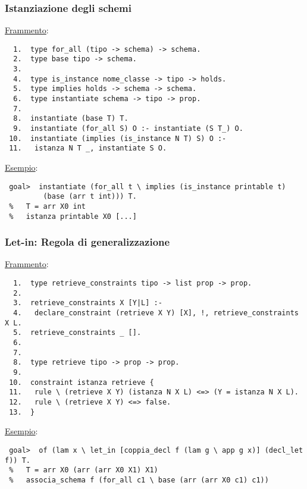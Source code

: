 \documentclass{beamer}
\begin{document}
\begin{frame}[fragile=singleslide]      %

 \frametitle{Istanziazione degli schemi}

 \underline{Frammento}:
 \begin{verbatim}
  1.  type for_all (tipo -> schema) -> schema.
  2.  type base tipo -> schema.
  3.
  4.  type is_instance nome_classe -> tipo -> holds.
  5.  type implies holds -> schema -> schema.
  6.  type instantiate schema -> tipo -> prop.
  7.
  8.  instantiate (base T) T.
  9.  instantiate (for_all S) O :- instantiate (S T_) O.
 10.  instantiate (implies (is_instance N T) S) O :-
 11.   istanza N T _, instantiate S O.
 \end{verbatim}

 \vfill

 \underline{Esempio}:
 \begin{verbatim}
 goal>  instantiate (for_all t \ implies (is_instance printable t)
         (base (arr t int))) T.
 %   T = arr X0 int
 %   istanza printable X0 [...]
 \end{verbatim}

\end{frame}


\begin{frame}[fragile=singleslide]      %

 \frametitle{Let-in: Regola di generalizzazione}

 \underline{Frammento}:
 \begin{verbatim}
  1.  type retrieve_constraints tipo -> list prop -> prop.
  2.
  3.  retrieve_constraints X [Y|L] :-
  4.   declare_constraint (retrieve X Y) [X], !, retrieve_constraints X L.
  5.  retrieve_constraints _ [].
  6.
  7.
  8.  type retrieve tipo -> prop -> prop.
  9.
 10.  constraint istanza retrieve {
 11.   rule \ (retrieve X Y) (istanza N X L) <=> (Y = istanza N X L).
 12.   rule \ (retrieve X Y) <=> false.
 13.  }
 \end{verbatim}
 
 \vfill

 \underline{Esempio}:
 \begin{verbatim}
 goal>  of (lam x \ let_in [coppia_decl f (lam g \ app g x)] (decl_let f)) T.
 %   T = arr X0 (arr (arr X0 X1) X1)
 %   associa_schema f (for_all c1 \ base (arr (arr X0 c1) c1))
 \end{verbatim}

\end{frame}
\end{document}
